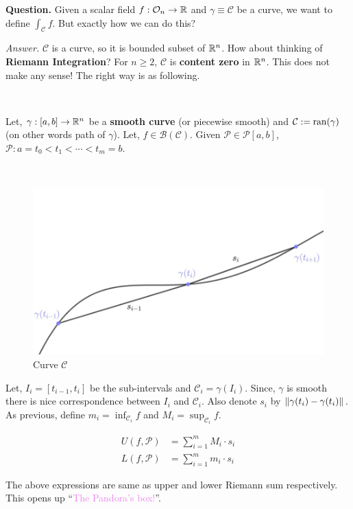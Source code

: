 \documentclass[../Analysis-3]{subfiles}
\begin{document}
\textbf{Question.} Given a scalar field $f : \mathcal{O}_{n} \to \mathbb{R}$ and $\gamma \equiv \mathcal{C}$ be a curve, we want to define $\displaystyle\int_{\mathcal{C}} f$. But exactly how we can do this?

\textit{Answer.} $\mathcal{C}$ is a curve, so it is bounded subset of $\mathbb{R}^n$. How about thinking of \textbf{Riemann Integration}? For $n \ge 2$, $\mathcal{C}$ is \textbf{content zero} in $\mathbb{R}^n$. This does not make any sense! The right way is as following.

\

Let, $\gamma :[a,b]\to \mathbb{R}^n$ be a \textbf{smooth curve} (or piecewise smooth) and $\mathcal{C} := \operatorname{ran}(\gamma)$ (on other words path of $\gamma$). Let, $f \in \mathscr{B}(\mathcal{C})$. Given $\mathcal{P} \in \mathscr{P}[a,b]$, $\mathcal{P} : a = t_0 < t_1 < \cdots < t_m = b$.

\

\begin{figure}
    \centering
    \includegraphics[width=.98\linewidth]{../figures/lec-23.1.png}
    \caption{Curve $\mathcal{C}$}
\end{figure}

Let, $I_i = [t_{i-1},t_i]$ be the sub-intervals and $\mathcal{C}_i = \gamma(I_i)$. Since, $\gamma$ is smooth there is nice correspondence between $I_i$ and $\mathcal{C}_i$. Also denote $s_i$ by $\norm{\gamma(t_i) - \gamma(t_i)}$. As previous, define $m_i = \inf_{\mathcal{C}_i}f$ and $M_i = \sup_{\mathcal{C}_i}f$.

\begin{align*}
    U(f,\mathcal{P}) & = \sum_{i=1}^{m}M_i\cdot s_i \\
    L(f,\mathcal{P}) & = \sum_{i=1}^{m}m_i\cdot s_i
\end{align*}

The above expressions are same as upper and lower Riemann sum respectively. This opens up ``\textcolor{violet}{The Pandora's box!}''.
\end{document}
